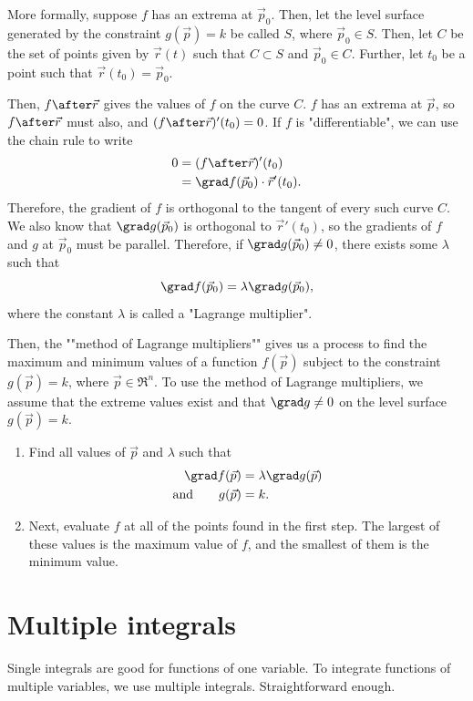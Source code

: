 \documentclass[knowledge]{rbt-mathnotes}
\begin{document}
More formally, suppose $f$ has an extrema at $\vec p_0$. Then, let the level
surface generated by the constraint $g(\vec p) = k$ be called $S$, where
$\vec p_0 \in S$. Then, let $C$ be the set of points given by $\vec r(t)$ such
that $C \subset S$ and $\vec p_0 \in C$. Further, let $t_0$ be a point such
that $\vec r(t_0) = \vec p_0$.

Then, $f \after \vec r$ gives the values of $f$ on the curve $C$. $f$ has an
extrema at $\vec p$, so $f \after \vec r$ must also, and $(f \after \vec
r)'(t_0) = 0$. If $f$ is "differentiable", we can use the chain rule to
write
\begin{alignat*}{1}
  0 &= (f \after \vec r)'(t_0) \\
  &= \grad f(\vec p_0) \cdot \vec r'(t_0).
\end{alignat*}
Therefore, the gradient of $f$ is orthogonal to the tangent of every such
curve $C$. We also know that $\grad g(\vec p_0)$ is orthogonal to $\vec
r'(t_0)$, so the gradients of $f$ and $g$ at $\vec p_0$ must be parallel.
Therefore, if $\grad g(\vec p_0) \ne 0$, there exists some $\lambda$ such
that
\begin{equation}
  \grad f(\vec p_0) = \lambda \grad g(\vec p_0),
\end{equation}
where the constant $\lambda$ is called a "Lagrange multiplier".

Then, the ""method of Lagrange multipliers"" gives us a process to
find the maximum and minimum values of a function $f(\vec p)$ subject to the
constraint  $g(\vec p) = k$, where $\vec p \in \Re^n$. To use the method of
Lagrange multipliers, we assume that the extreme values exist and that
$\grad g \ne 0$ on the level surface $g(\vec p) = k$.
\begin{enumerate}
  \item Find all values of $\vec p$ and $\lambda$ such that
  \begin{alignat*}{1}
    \grad f(\vec p) &=  \lambda \grad g(\vec p) \\
  \text{and}\qquad g(\vec p) &= k. \\
  \end{alignat*}

  \item Next, evaluate $f$ at all of the points found in the first step. The
  largest of these values is the maximum value of $f$, and the smallest of
  them is the minimum value.
\end{enumerate}

\chapter{Multiple integrals}
Single integrals are good for functions of one variable. To integrate
functions of multiple variables, we use multiple integrals. Straightforward
enough.
\end{document}
